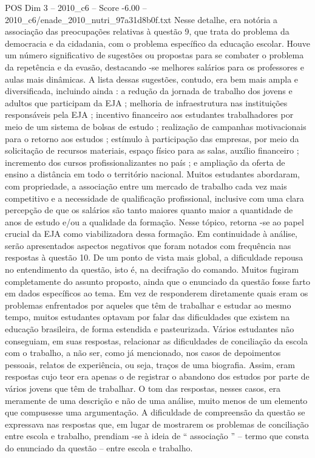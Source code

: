 \begin{textsample}{POS Dim 3 – 2010\_c6 – Score -6.00 – 2010\_c6/enade\_2010\_nutri\_97a31d8b0f.txt}
Nesse detalhe, era notória a associação das preocupações relativas à questão 9, que trata do problema da democracia e da cidadania, com o problema específico da educação escolar.
Houve um número significativo de sugestões ou propostas para se combater o problema da repetência e da evasão, destacando -se melhores salários para os professores e aulas mais dinâmicas.
A lista dessas sugestões, contudo, era bem mais ampla e diversificada, incluindo ainda : a redução da jornada de trabalho dos jovens e adultos que participam da EJA ; melhoria de infraestrutura nas instituições responsáveis pela EJA ; incentivo financeiro aos estudantes trabalhadores por meio de um sistema de bolsas de estudo ; realização de campanhas motivacionais para o retorno aos estudos ; estímulo à participação das empresas, por meio da solicitação de recursos materiais, espaço físico para as salas, auxílio financeiro ; incremento dos cursos profissionalizantes no país ; e ampliação da oferta de ensino a distância em todo o território nacional.
Muitos estudantes abordaram, com propriedade, a associação entre um mercado de trabalho cada vez mais competitivo e a necessidade de qualificação profissional, inclusive com uma clara percepção de que os salários são tanto maiores quanto maior a quantidade de anos de estudo e/ou a qualidade da formação.
Nesse tópico, retorna -se ao papel crucial da EJA como viabilizadora dessa formação.
Em continuidade à análise, serão apresentados aspectos negativos que foram notados com frequência nas respostas à questão 10.
De um ponto de vista mais global, a dificuldade repousa no entendimento da questão, isto é, na decifração do comando.
Muitos fugiram completamente do assunto proposto, ainda que o enunciado da questão fosse farto em dados específicos ao tema.
Em vez de responderem diretamente quais eram os problemas enfrentados por aqueles que têm de trabalhar e estudar ao mesmo tempo, muitos estudantes optavam por falar das dificuldades que existem na educação brasileira, de forma estendida e pasteurizada.
Vários estudantes não conseguiam, em suas respostas, relacionar as dificuldades de conciliação da escola com o trabalho, a não ser, como já mencionado, nos casos de depoimentos pessoais, relatos de experiência, ou seja, traços de uma biografia.
Assim, eram respostas cujo teor era apenas o de registrar o abandono dos estudos por parte de vários jovens que têm de trabalhar.
O tom das respostas, nesses casos, era meramente de uma descrição e não de uma análise, muito menos de um elemento que compusesse uma argumentação.
A dificuldade de compreensão da questão se expressava nas respostas que, em lugar de mostrarem os problemas de conciliação entre escola e trabalho, prendiam -se à ideia de “ associação ” – termo que consta do enunciado da questão – entre escola e trabalho.

\end{textsample}
